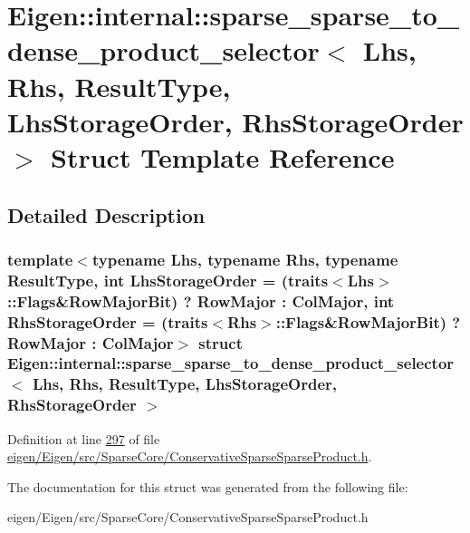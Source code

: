 \hypertarget{struct_eigen_1_1internal_1_1sparse__sparse__to__dense__product__selector}{}\section{Eigen\+:\+:internal\+:\+:sparse\+\_\+sparse\+\_\+to\+\_\+dense\+\_\+product\+\_\+selector$<$ Lhs, Rhs, Result\+Type, Lhs\+Storage\+Order, Rhs\+Storage\+Order $>$ Struct Template Reference}
\label{struct_eigen_1_1internal_1_1sparse__sparse__to__dense__product__selector}


\subsection{Detailed Description}
\subsubsection*{template$<$typename Lhs, typename Rhs, typename Result\+Type, int Lhs\+Storage\+Order = (traits$<$\+Lhs$>$\+::\+Flags\&\+Row\+Major\+Bit) ? Row\+Major \+: Col\+Major, int Rhs\+Storage\+Order = (traits$<$\+Rhs$>$\+::\+Flags\&\+Row\+Major\+Bit) ? Row\+Major \+: Col\+Major$>$\newline
struct Eigen\+::internal\+::sparse\+\_\+sparse\+\_\+to\+\_\+dense\+\_\+product\+\_\+selector$<$ Lhs, Rhs, Result\+Type, Lhs\+Storage\+Order, Rhs\+Storage\+Order $>$}



Definition at line \hyperlink{eigen_2_eigen_2src_2_sparse_core_2_conservative_sparse_sparse_product_8h_source_l00297}{297} of file \hyperlink{eigen_2_eigen_2src_2_sparse_core_2_conservative_sparse_sparse_product_8h_source}{eigen/\+Eigen/src/\+Sparse\+Core/\+Conservative\+Sparse\+Sparse\+Product.\+h}.



The documentation for this struct was generated from the following file\+:\begin{DoxyCompactItemize}
\item 
eigen/\+Eigen/src/\+Sparse\+Core/\+Conservative\+Sparse\+Sparse\+Product.\+h\end{DoxyCompactItemize}
